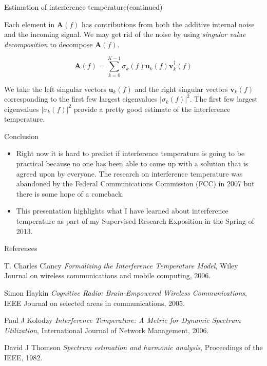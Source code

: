 \documentclass[mathserif]{beamer}
\begin{document}
\begin{frame}{Estimation of interference temperature(continued)}

Each element in $\mathbf{A}(f)$ has contributions from both the additive internal noise and the incoming signal. We may get rid of the noise by using \emph{singular value decomposition} to decompose $\mathbf{A}(f)$.

\begin{equation}
    \mathbf{A}(f) = \sum_{k=0}^{K-1} \sigma_k(f) \mathbf{u}_k(f) \mathbf{v}_k^{\dag}(f)
\end{equation}

We take the left singular vectors $\mathbf{u}_k(f)$ and the right singular vectors $\mathbf{v}_k(f)$ corresponding to the first few largest eigenvalues $|\sigma_k(f)|^2$. The first few largest eigenvalues $|\sigma_k(f)|^2$ provide a pretty good estimate of the interference temperature.

\end{frame}

\begin{frame}{Conclusion}

\begin{itemize}
	\item Right now it is hard to predict if interference temperature is going to be practical because no one has been able to come up with a solution that is agreed upon by everyone. The research on interference temperature was abandoned by the Federal Communications Commission (FCC) in 2007 but there is some hope of a comeback.
	\item This presentation highlights what I have learned about interference temperature as part of my Supervised Research Exposition in the Spring of 2013.

\end{itemize}
\end{frame}




\begin{frame}{References}

\begin{thebibliography}{10}

	T. Charles Clancy
    \newblock \emph{Formalizing the Interference Temperature Model},
    \newblock Wiley Journal on wireless communications and mobile computing, 2006.

    Simon Haykin
    \newblock  \emph{Cognitive Radio: Brain-Empowered Wireless Communications},
    \newblock IEEE Journal on selected areas in communications, 2005.

    Paul J Kolodzy
    \newblock \emph{Interference Temperature: A Metric for Dynamic Spectrum Utilization},
    \newblock International Journal of Network Management, 2006.

	David J Thomson
    \newblock \emph{Spectrum estimation and harmonic analysis},
    \newblock Proceedings of the IEEE, 1982.

\end{thebibliography}

\end{frame}
\end{document}
